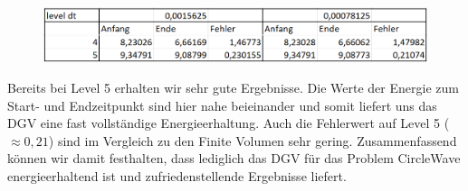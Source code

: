 \begin{figure}[H]
	\centering
	\includegraphics[width=\textwidth]{../Aufgabe21/deg=2CircleWaveEnergieTabelle.png}
\end{figure}

Bereits bei Level 5 erhalten wir sehr gute Ergebnisse.
Die Werte der Energie zum Start- und Endzeitpunkt sind hier nahe beieinander und somit liefert uns das DGV eine fast vollständige Energieerhaltung. Auch die Fehlerwert auf Level 5 ($\approx 0,21$) sind im Vergleich zu den Finite Volumen sehr gering. Zusammenfassend können wir damit festhalten, dass lediglich das DGV für das Problem CircleWave energieerhaltend ist und zufriedenstellende Ergebnisse liefert.



\newpage
